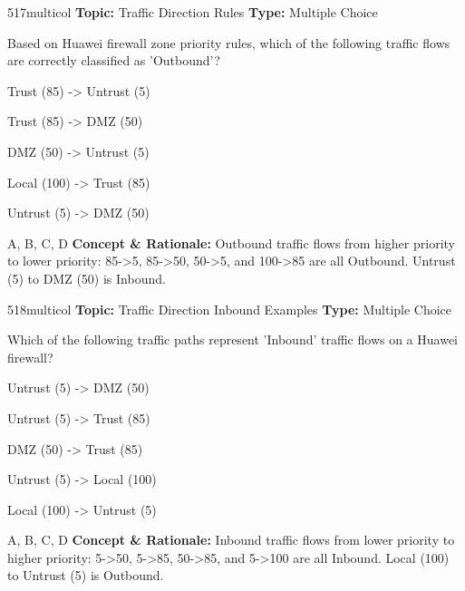 \begin{qcard}{517}{multicol}
\textcolor{darkslate!75}{\small\textbf{Topic:} Traffic Direction Rules \hfill \textbf{Type:} Multiple Choice}\vspace{0.4em}\par
Based on Huawei firewall zone priority rules, which of the following traffic flows are correctly classified as 'Outbound'?
\begin{qoptions}
\item Trust (85) -\textgreater{} Untrust (5)
\item Trust (85) -\textgreater{} DMZ (50)
\item DMZ (50) -\textgreater{} Untrust (5)
\item Local (100) -\textgreater{} Trust (85)
\item Untrust (5) -\textgreater{} DMZ (50)
\end{qoptions}
\end{qcard}
\nopagebreak
\begin{explainbox}{A, B, C, D}
\textbf{Concept \& Rationale:} Outbound traffic flows from higher priority to lower priority: 85-\textgreater{}5, 85-\textgreater{}50, 50-\textgreater{}5, and 100-\textgreater{}85 are all Outbound. Untrust (5) to DMZ (50) is Inbound.
\end{explainbox}

\begin{qcard}{518}{multicol}
\textcolor{darkslate!75}{\small\textbf{Topic:} Traffic Direction Inbound Examples \hfill \textbf{Type:} Multiple Choice}\vspace{0.4em}\par
Which of the following traffic paths represent 'Inbound' traffic flows on a Huawei firewall?
\begin{qoptions}
\item Untrust (5) -\textgreater{} DMZ (50)
\item Untrust (5) -\textgreater{} Trust (85)
\item DMZ (50) -\textgreater{} Trust (85)
\item Untrust (5) -\textgreater{} Local (100)
\item Local (100) -\textgreater{} Untrust (5)
\end{qoptions}
\end{qcard}
\nopagebreak
\begin{explainbox}{A, B, C, D}
\textbf{Concept \& Rationale:} Inbound traffic flows from lower priority to higher priority: 5-\textgreater{}50, 5-\textgreater{}85, 50-\textgreater{}85, and 5-\textgreater{}100 are all Inbound. Local (100) to Untrust (5) is Outbound.
\end{explainbox}

